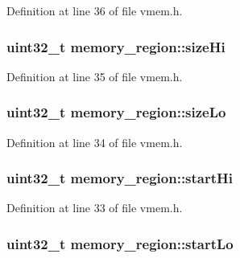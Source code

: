Definition at line 36 of file vmem.\+h.

\subsubsection[{\texorpdfstring{size\+Hi}{sizeHi}}]{\setlength{\rightskip}{0pt plus 5cm}uint32\+\_\+t memory\+\_\+region\+::size\+Hi}\hypertarget{structmemory__region_a3d6aa91c428379cfc829556e48aee067}{}\label{structmemory__region_a3d6aa91c428379cfc829556e48aee067}


Definition at line 35 of file vmem.\+h.

\subsubsection[{\texorpdfstring{size\+Lo}{sizeLo}}]{\setlength{\rightskip}{0pt plus 5cm}uint32\+\_\+t memory\+\_\+region\+::size\+Lo}\hypertarget{structmemory__region_a4a94d273dbfc6c96ab6a5a26ba2e9673}{}\label{structmemory__region_a4a94d273dbfc6c96ab6a5a26ba2e9673}


Definition at line 34 of file vmem.\+h.

\subsubsection[{\texorpdfstring{start\+Hi}{startHi}}]{\setlength{\rightskip}{0pt plus 5cm}uint32\+\_\+t memory\+\_\+region\+::start\+Hi}\hypertarget{structmemory__region_a090957a0a7f28700a605cf6f5e8f614a}{}\label{structmemory__region_a090957a0a7f28700a605cf6f5e8f614a}


Definition at line 33 of file vmem.\+h.

\subsubsection[{\texorpdfstring{start\+Lo}{startLo}}]{\setlength{\rightskip}{0pt plus 5cm}uint32\+\_\+t memory\+\_\+region\+::start\+Lo}\hypertarget{structmemory__region_a85b8ec619e9aa2053ea033c5b7d3683c}{}\label{structmemory__region_a85b8ec619e9aa2053ea033c5b7d3683c}


